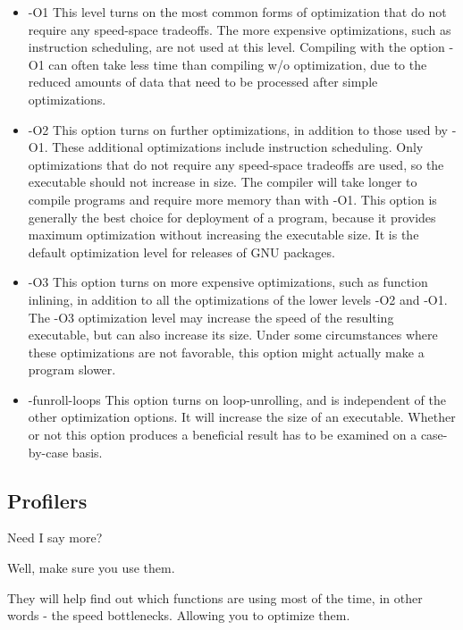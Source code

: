 \documentclass{article}
\begin{document}
 \begin{itemize}
 \item{-O1 }
     This level turns on the most common forms of optimization that do not require any speed-space tradeoffs.
     The more expensive optimizations, such as instruction scheduling, are not used at this level. 
  Compiling with the option -O1 can often take less time than compiling w/o optimization, due to the reduced amounts of data that need to be processed after simple optimizations. 
 
 \item{-O2}
     This option turns on further optimizations, in addition to those used by -O1.
  These additional optimizations include instruction scheduling.
  Only optimizations that do not require any speed-space tradeoffs are used, so the executable should not increase in size.
  The compiler will take longer to compile programs and require more memory than with -O1.
  This option is generally the best choice for deployment of a program, because it provides maximum optimization without increasing the executable size.
  It is the default optimization level for releases of GNU packages. 
 
 \item{-O3}
     This option turns on more expensive optimizations, such as function inlining, in addition to all the optimizations of the lower levels -O2 and -O1.
  The -O3 optimization level may increase the speed of the resulting executable, but can also increase its size.
  Under some circumstances where these optimizations are not favorable, this option might actually make a program slower. 
 
 \item {-funroll-loops}
  This option turns on loop-unrolling, and is independent of the other optimization options.
  It will increase the size of an executable. Whether or not this option produces a beneficial result has to be examined on a case-by-case basis. 
 
 \end{itemize}

 \subsection{Profilers}

 Need I say more?

 Well, make sure you use them.

  They  will help find out which functions are using most of the time, in other words - the speed bottlenecks. Allowing you to optimize them. 
\end{document}
